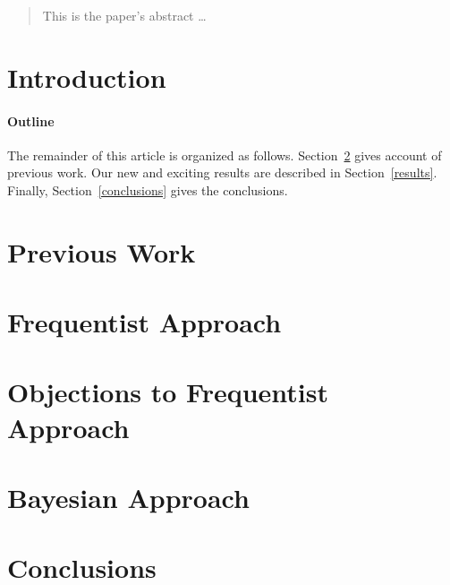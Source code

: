 \documentclass[12pt]{article}
\begin{document}
\maketitle

\begin{abstract}
This is the paper's abstract \ldots
\end{abstract}

\section{Introduction}

\paragraph{Outline}
The remainder of this article is organized as follows.
Section~\ref{previous work} gives account of previous work.
Our new and exciting results are described in Section~\ref{results}.
Finally, Section~\ref{conclusions} gives the conclusions.

\section{Previous Work}\label{previous work}


\section{Frequentist Approach}

\section{Objections to Frequentist Approach}

\section{Bayesian Approach}

\section{Conclusions}




\end{document}
